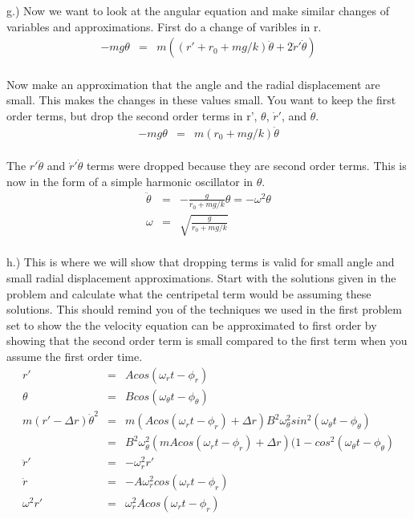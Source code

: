 \documentclass[11pt]{amsart}
\begin{document}
g.) Now we want to look at the angular equation and make similar changes of variables and approximations. First do a change of varibles in r. \\
\begin{eqnarray*} 
-mg\theta &=& m((r'+r_{0}+mg/k)\ddot{\theta}+2\dot{r}'\dot{\theta}) 
\end{eqnarray*} \\
Now make an approximation that the angle and the radial displacement are small. This makes the changes in these values small. You want to keep the first order terms, but drop the second order terms in r', $\theta$, $\dot{r}'$, and $\dot{\theta}$. \\
\begin{eqnarray*}
-mg\theta &=& m(r_{0}+mg/k)\ddot{\theta} 
\end{eqnarray*} \\
The $r'\ddot{\theta}$ and $\dot{r}'\dot{\theta}$ terms were dropped because they are second order terms. This is now in the form of a simple harmonic oscillator in $\theta$. \\
\begin{eqnarray*}
\ddot{\theta} &=& -\frac{g}{r_{0}+mg/k}\theta = -\omega^{2}\theta \\
\omega &=& \sqrt{\frac{g}{r_{0}+mg/k}} 
\end{eqnarray*} \\
h.) This is where we will show that dropping terms is valid for small angle and small radial displacement approximations. Start with the solutions given in the problem and calculate what the centripetal term would be assuming these solutions. This should remind you of the techniques we used in the first problem set to show the the velocity equation can be approximated to first order by showing that the second order term is small compared to the first term when you assume the first order time. \\ 
\begin{eqnarray*}
r' &=& Acos(\omega_{r}t-\phi_{r}) \\
\theta &=& Bcos(\omega_{\theta}t-\phi_{\theta}) \\
m(r'-\Delta{r})\dot{\theta}^{2} &=& m( Acos(\omega_{r}t-\phi_{r})+\Delta{r})B^{2}\omega_{\theta}^{2}sin^{2}(\omega_{\theta}t-\phi_{\theta}) \\
&=& B^{2}\omega_{\theta}^{2}(mAcos(\omega_{r}t-\phi_{r}) + \Delta{r})(1-cos^{2}(\omega_{\theta}t-\phi_{\theta}) \\
\ddot{r}' &=& -\omega_{r}^{2}r' \\
\ddot{r} &=& -A\omega_{r}^{2}cos(\omega_{r}t-\phi_{r}) \\
\omega^{2}r' &=&\omega_{r}^{2}Acos(\omega_{r}t-\phi_{r}) 
\end{eqnarray*} \\
\end{document}
